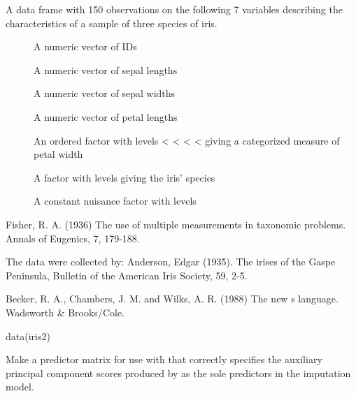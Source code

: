 \documentclass[letterpaper]{book}
\begin{document}
%
\begin{Format}
A data frame with 150 observations on the following 7 variables
describing the characteristics of a sample of three species of iris.
\begin{description}

\item[] 
A numeric vector of IDs

\item[] 
A numeric vector of sepal lengths

\item[] 
A numeric vector of sepal widths

\item[] 
A numeric vector of petal lengths

\item[] 
An ordered factor with levels  <  <  <
 <  giving a categorized measure of petal width

\item[] 
A factor with levels  
 giving the iris' species

\item[] 
A constant nuisance factor with levels 


\end{description}

\end{Format}
%
\begin{Source}\relax
Fisher, R. A. (1936) The use of multiple measurements in taxonomic
problems. Annals of Eugenics, 7, 179-188.

The data were collected by:
Anderson, Edgar (1935). The irises of the Gaspe Peninsula, Bulletin
of the American Iris Society, 59, 2-5.
\end{Source}
%
\begin{References}\relax
Becker, R. A., Chambers, J. M. and Wilks, A. R. (1988) The new s
language. Wadsworth \& Brooks/Cole.
\end{References}
%
\begin{Examples}
\begin{ExampleCode}
data(iris2)
\end{ExampleCode}
\end{Examples}
%
\begin{Description}\relax
Make a predictor matrix for use with  that correctly
specifies the auxiliary principal component scores produced by
 as the sole predictors in the imputation model.
\end{Description}
\end{document}
